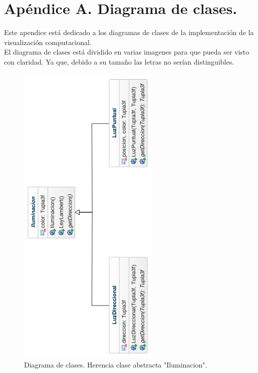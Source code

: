 \chapter{Apéndice A. Diagrama de clases.}

Este apendice está dedicado a los diagramas de clases de la implementación de la visualización computacional.
${ }$\\

El diagrama de clases está dividido en varias imagenes para que pueda ser visto con claridad. Ya que, debido a su tamaño las letras no serían distinguibles.
${ }$\\

\begin{figure}[h]
	\begin{center}
		\includegraphics[width=0.6\textwidth]{imagenes/diagrama-clases-iluminacion.png}
	\end{center}
	\caption{Diagrama de clases. Herencia clase abstracta "Iluminacion".}
	\label{fig:etiq_31}
\end{figure}


